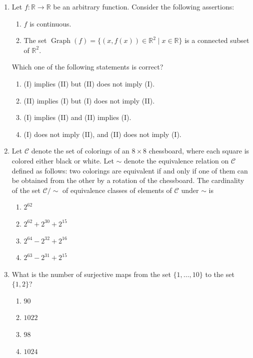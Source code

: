 \documentclass[11pt, a4paper]{article}
\begin{document}
\begin{enumerate}
  \item Let $f: \mathbb{R} \to \mathbb{R}$ be an arbitrary function. Consider the following assertions:
  \begin{enumerate}[label=(\Roman*)]
    \item $f$ is continuous.
    \item The set $\operatorname{Graph}(f) = \{(x, f(x)) \in \mathbb{R}^2 \mid x \in \mathbb{R}\}$ is a connected subset of $\mathbb{R}^2$.
  \end{enumerate}
  Which one of the following statements is correct?
  \begin{enumerate}[label=(\alph*)]
    \item (I) implies (II) but (II) does not imply (I).
    \item (II) implies (I) but (I) does not imply (II).
    \item (I) implies (II) and (II) implies (I).
    \item (I) does not imply (II), and (II) does not imply (I).
  \end{enumerate}

  \item Let $\mathcal{C}$ denote the set of colorings of an $8 \times 8$ chessboard, where each square is colored either black or white. Let $\sim$ denote the equivalence relation on $\mathcal{C}$ defined as follows: two colorings are equivalent if and only if one of them can be obtained from the other by a rotation of the chessboard. The cardinality of the set $\mathcal{C}/\sim$ of equivalence classes of elements of $\mathcal{C}$ under $\sim$ is
  \begin{enumerate}[label=(\alph*)]
    \item $2^{62}$
    \item $2^{62} + 2^{30} + 2^{15}$
    \item $2^{64} - 2^{32} + 2^{16}$
    \item $2^{63} - 2^{31} + 2^{15}$
  \end{enumerate}

  \item What is the number of surjective maps from the set $\{1, \dots, 10\}$ to the set $\{1, 2\}$?
  \begin{enumerate}[label=(\alph*)]
    \item $90$
    \item $1022$
    \item $98$
    \item $1024$
  \end{enumerate}


\end{enumerate}
\end{document}
